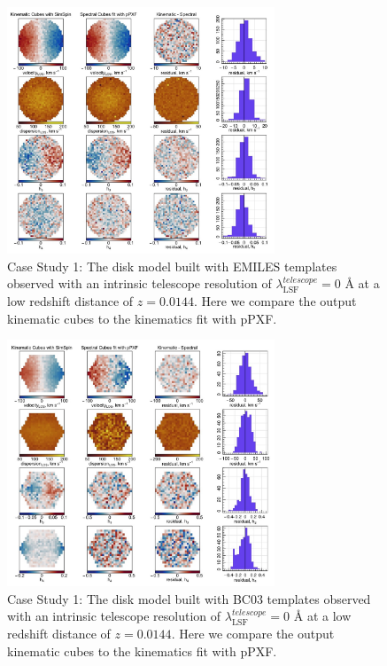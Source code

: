 \documentclass[
  journal=pasa,
  manuscript=research-paper, %
  year=2020,
  volume=37,
]{cup-journal}
\begin{document}
\begin{figure}
    \centering
    \includegraphics[keepaspectratio, width=8cm]{Figures/cs1_disk_velocities_lowz_EMILES.jpeg}
    \caption{Case Study 1: The disk model built with EMILES templates observed with an intrinsic telescope resolution of  $\lambda_{\text{LSF}}^{telescope} = 0$ \AA{} at a low redshift distance of $z = 0.0144$. Here we compare the output kinematic cubes to the kinematics fit with pPXF.}
    \label{fig:cs1_disk_EMILES}
\end{figure}

\begin{figure}
    \centering
    \includegraphics[keepaspectratio, width=8cm]{Figures/cs1_disk_velocities_lowz_BC03.jpeg}
    \caption{Case Study 1: The disk model built with BC03 templates observed with an intrinsic telescope resolution of  $\lambda_{\text{LSF}}^{telescope} = 0$ \AA{} at a low redshift distance of $z = 0.0144$. Here we compare the output kinematic cubes to the kinematics fit with pPXF.}
    \label{fig:cs1_disk_BC03}
\end{figure}
\end{document}
